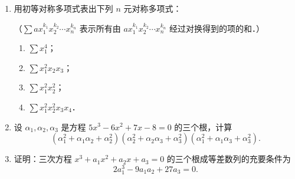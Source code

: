 \begin{enumerate}
\begin{enumerate}
  \anssub
    \item $x_1^2x_2^2+x_1^2x_3^2+x_1^2x_4^2+x_2^2x_3^2+x_2^2x_4^2+x_3^2x_4^2$；
  \anssub
    \item $(x_1x_2+x_3)(x_2x_3+x_1)(x_3x_1+x_2)$；
  \anssub
    \item $(x_1+x_2+x_1x_2)(x_2+x_3+x_2x_3)(x_1+x_3+x_1x_3)$．
  \anssub
  \end{enumerate}
  \item 用初等对称多项式表出下列 $n$ 元对称多项式：\par
  （$\sum ax_1^{k_1}x_2^{k_2}\cdots x_n^{k_n}$ 表示所有由 $ax_1^{k_1}x_2^{k_2}\cdots x_n^{k_n}$ 经过对换得到的项的和．）
  \begin{enumerate}
    \item $\sum x_1^4$；
  \anssub
    \item $\sum x_1^2x_2x_3$；
  \anssub
    \item $\sum x_1^2x_2^2$；
  \anssub
    \item $\sum x_1^2x_2^2x_3x_4$．
  \anssub
  \end{enumerate}
  \item 设 $\alpha_1,\alpha_2,\alpha_3$ 是方程 $5x^3-6x^2+7x-8=0$ 的三个根，计算
  \[
    (\alpha_1^2+\alpha_1\alpha_2+\alpha_2^2)(\alpha_2^2+\alpha_2\alpha_3+\alpha_3^2)(\alpha_1^2+\alpha_1\alpha_3+\alpha_3^2).
  \]
  \anscompute
  \item 证明：三次方程 $x^3+a_1x^2+a_2x+a_3=0$ 的三个根成等差数列的充要条件为
  \[
    2a_1^3-9a_1a_2+27a_3=0.
  \]
  \ansproof
\end{enumerate}
